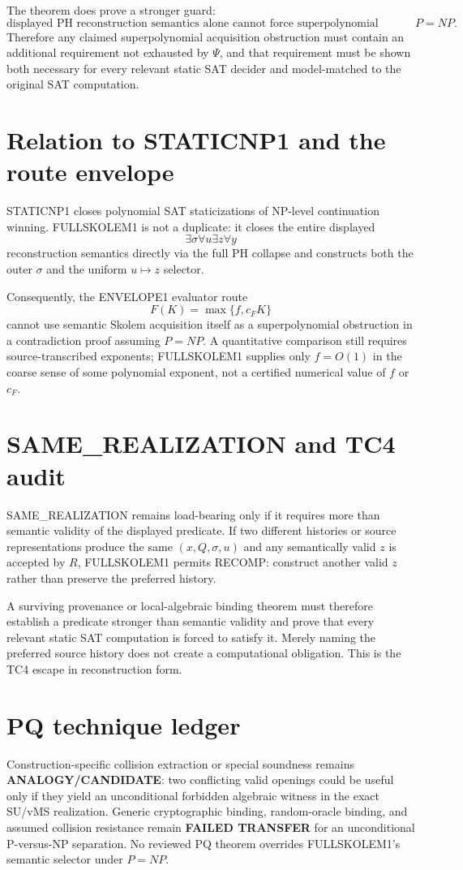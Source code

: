 \documentclass[11pt]{article}
\begin{document}
The theorem does prove a stronger guard:
\[
\boxed{\text{displayed PH reconstruction semantics alone cannot force superpolynomial evaluator acquisition under }P=NP.}
\]
Therefore any claimed superpolynomial acquisition obstruction must contain an additional requirement not exhausted by \(\Psi\), and that requirement must be shown both necessary for every relevant static SAT decider and model-matched to the original SAT computation.

\section*{Relation to STATICNP1 and the route envelope}
STATICNP1 closes polynomial SAT staticizations of NP-level continuation winning. FULLSKOLEM1 is not a duplicate: it closes the entire displayed
\[
\exists\sigma\forall u\exists z\forall y
\]
reconstruction semantics directly via the full PH collapse and constructs both the outer \(\sigma\) and the uniform \(u\mapsto z\) selector.

Consequently, the ENVELOPE1 evaluator route
\[
F(K)=\max\{f,c_FK\}
\]
cannot use semantic Skolem acquisition itself as a superpolynomial obstruction in a contradiction proof assuming \(P=NP\). A quantitative comparison still requires source-transcribed exponents; FULLSKOLEM1 supplies only \(f=O(1)\) in the coarse sense of some polynomial exponent, not a certified numerical value of \(f\) or \(c_F\).

\section*{SAME\_REALIZATION and TC4 audit}
SAME\_REALIZATION remains load-bearing only if it requires more than semantic validity of the displayed predicate. If two different histories or source representations produce the same \((x,Q,\sigma,u)\) and any semantically valid \(z\) is accepted by \(R\), FULLSKOLEM1 permits RECOMP: construct another valid \(z\) rather than preserve the preferred history.

A surviving provenance or local-algebraic binding theorem must therefore establish a predicate stronger than semantic validity and prove that every relevant static SAT computation is forced to satisfy it. Merely naming the preferred source history does not create a computational obligation. This is the TC4 escape in reconstruction form.

\section*{PQ technique ledger}
Construction-specific collision extraction or special soundness remains \textbf{ANALOGY/CANDIDATE}: two conflicting valid openings could be useful only if they yield an unconditional forbidden algebraic witness in the exact SU/vMS realization. Generic cryptographic binding, random-oracle binding, and assumed collision resistance remain \textbf{FAILED TRANSFER} for an unconditional P-versus-NP separation. No reviewed PQ theorem overrides FULLSKOLEM1's semantic selector under \(P=NP\).
\end{document}
